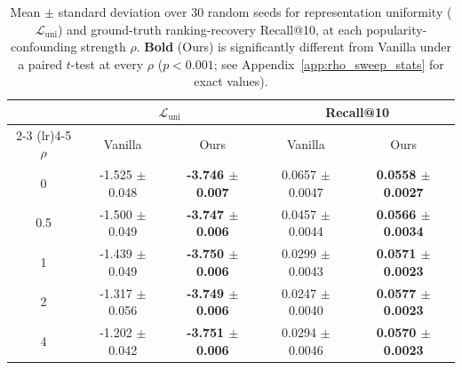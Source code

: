 \begin{table}[t]
\centering
\caption{Mean $\pm$ standard deviation over 30 random seeds for representation uniformity ($\mathcal{L}_{\mathrm{uni}}$) and ground-truth ranking-recovery Recall@10, at each popularity-confounding strength $\rho$. \textbf{Bold} (Ours) is significantly different from Vanilla under a paired $t$-test at every $\rho$ ($p<0.001$; see Appendix~\ref{app:rho_sweep_stats} for exact values).}
\label{tab:rho_mean_sd}
\begin{tabular}{c cc cc}
\toprule
 & \multicolumn{2}{c}{$\mathcal{L}_{\mathrm{uni}}$} & \multicolumn{2}{c}{Recall@10} \\
\cmidrule(lr){2-3} \cmidrule(lr){4-5}
$\rho$ & Vanilla & Ours & Vanilla & Ours \\
\midrule
0 & -1.525 $\pm$ 0.048 & \textbf{-3.746 $\pm$ 0.007} & 0.0657 $\pm$ 0.0047 & \textbf{0.0558 $\pm$ 0.0027} \\
0.5 & -1.500 $\pm$ 0.049 & \textbf{-3.747 $\pm$ 0.006} & 0.0457 $\pm$ 0.0044 & \textbf{0.0566 $\pm$ 0.0034} \\
1 & -1.439 $\pm$ 0.049 & \textbf{-3.750 $\pm$ 0.006} & 0.0299 $\pm$ 0.0043 & \textbf{0.0571 $\pm$ 0.0023} \\
2 & -1.317 $\pm$ 0.056 & \textbf{-3.749 $\pm$ 0.006} & 0.0247 $\pm$ 0.0040 & \textbf{0.0577 $\pm$ 0.0023} \\
4 & -1.202 $\pm$ 0.042 & \textbf{-3.751 $\pm$ 0.006} & 0.0294 $\pm$ 0.0046 & \textbf{0.0570 $\pm$ 0.0023} \\
\bottomrule
\end{tabular}
\end{table}
